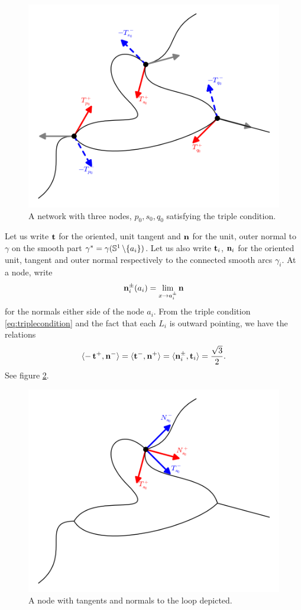 \documentclass[11pt]{amsart}
\begin{document}
\begin{figure}[htb]
\centering
\includegraphics[width=.9\linewidth]{network}
\caption{A network with three nodes, $p_0, s_0, q_0$ satisfying the triple condition.}
\label{fg:network}
\end{figure}

Let us write \(\operatorname{\mathbf{t}}\) for the oriented, unit tangent and \(\operatorname{\mathbf{n}}\) for the unit, outer normal to \(\gamma\) on the smooth part \(\gamma^{\ast} = \gamma(\mathbb{S}^1\operatorname{\backslash}\{a_i\})\). Let us also write \(\operatorname{\mathbf{t}}_i\), \(\operatorname{\mathbf{n}}_i\) for the oriented unit, tangent and outer normal respectively to the connected smooth arcs \(\gamma_i\). At a node, write
\[
\operatorname{\mathbf{n}}_i^{\pm}(a_i) = \lim_{x\to a_i^{\pm}} \operatorname{\mathbf{n}}
\]
for the normals either side of the node \(a_i\). From the triple condition \eqref{eq:triplecondition} and the fact that each \(L_i\) is outward pointing, we have the relations
\begin{equation}
\label{eq:triplerelations}
\langle{-\operatorname{\mathbf{t}}^+},{\operatorname{\mathbf{n}}^-}\rangle = \langle{\operatorname{\mathbf{t}}^-},{\operatorname{\mathbf{n}}^+}\rangle = \langle{\operatorname{\mathbf{n}}_i^{\pm}},{\operatorname{\mathbf{t}}_i}\rangle = \frac{\sqrt{3}}{2}.
\end{equation}
See figure \ref{fg:node}.
\begin{figure}[htb]
\centering
\includegraphics[width=.9\linewidth]{node}
\caption{A node with tangents and normals to the loop depicted.}
\label{fg:node}
\end{figure}
\end{document}
